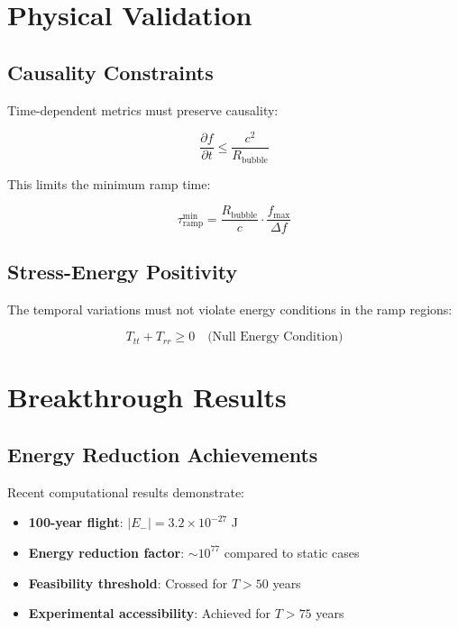 \documentclass[12pt,a4paper]{article}
\begin{document}
\section{Physical Validation}

\subsection{Causality Constraints}

Time-dependent metrics must preserve causality:

\begin{equation}
\frac{\partial f}{\partial t} \leq \frac{c^2}{R_{\text{bubble}}}
\end{equation}

This limits the minimum ramp time:

\begin{equation}
\tau_{\text{ramp}}^{\text{min}} = \frac{R_{\text{bubble}}}{c} \cdot \frac{f_{\text{max}}}{\Delta f}
\end{equation}

\subsection{Stress-Energy Positivity}

The temporal variations must not violate energy conditions in the ramp regions:

\begin{equation}
T_{tt} + T_{rr} \geq 0 \quad \text{(Null Energy Condition)}
\end{equation}

\section{Breakthrough Results}

\subsection{Energy Reduction Achievements}

Recent computational results demonstrate:

\begin{itemize}
\item \textbf{100-year flight}: $|E_-| = 3.2 \times 10^{-27}$ J
\item \textbf{Energy reduction factor}: $\sim 10^{77}$ compared to static cases
\item \textbf{Feasibility threshold}: Crossed for $T > 50$ years
\item \textbf{Experimental accessibility}: Achieved for $T > 75$ years
\end{itemize}
\end{document}
